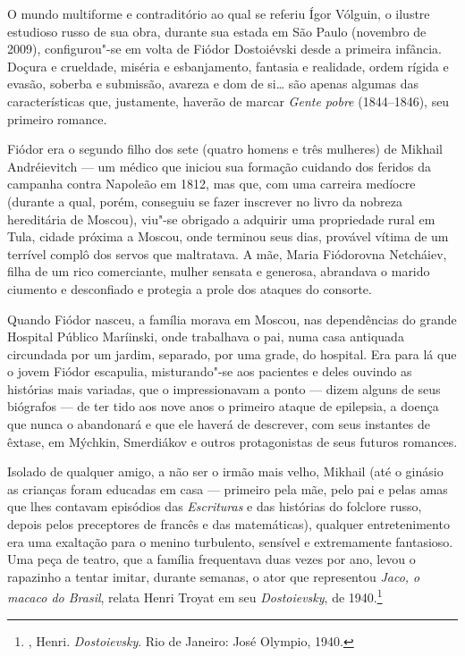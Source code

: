 O mundo multiforme e contraditório ao qual se referiu
Ígor Vólguin, o ilustre estudioso russo de sua obra, durante sua
estada em São Paulo (novembro de 2009), configurou"-se em volta
de Fiódor Dostoiévski desde a primeira infância. Doçura e
crueldade, miséria e esbanjamento, fantasia e realidade,
ordem rígida e evasão, soberba e submissão, avareza e dom
de si\ldots{} são apenas algumas das características que,
justamente, haverão de marcar \emph{Gente pobre} (1844--1846),
seu primeiro romance.

Fiódor era o segundo filho dos sete (quatro homens e três
mulheres) de Mikhail Andréievitch --- um médico que iniciou
sua formação cuidando dos feridos da campanha contra Napoleão
em 1812, mas que, com uma carreira medíocre (durante a qual,
porém, conseguiu se fazer inscrever no livro da nobreza
hereditária de Moscou), viu"-se obrigado a adquirir uma propriedade rural
em Tula, cidade próxima a Moscou, onde terminou seus dias,
provável vítima de um terrível complô dos servos que
maltratava. A mãe, Maria Fiódorovna Netcháiev, filha de um
rico comerciante, mulher sensata e generosa, abrandava o
marido ciumento e desconfiado e protegia a prole dos ataques do
consorte.

Quando Fiódor nasceu, a família morava em Moscou, nas dependências
do grande Hospital Público Maríinski, onde trabalhava o pai, numa
casa antiquada circundada por um jardim, separado, por uma grade,
do hospital. Era para lá que o jovem Fiódor escapulia,
misturando"-se aos pacientes e deles ouvindo as histórias mais
variadas, que o impressionavam a ponto --- dizem alguns de seus
biógrafos --- de ter tido aos nove anos o primeiro ataque de
epilepsia, a doença que nunca o abandonará e que ele haverá
de descrever, com seus instantes de êxtase, em Mýchkin,
Smerdiákov e outros protagonistas de seus futuros romances.

Isolado de qualquer amigo, a não ser o irmão mais velho, Mikhail
(até o ginásio as crianças foram educadas em casa --- primeiro
pela mãe, pelo pai e pelas amas que lhes contavam episódios das
\emph{Escrituras} e das histórias do folclore russo, depois pelos
preceptores de francês e das matemáticas), qualquer entretenimento
era uma exaltação para o menino turbulento, sensível e extremamente fantasioso. Uma peça de teatro, que a família frequentava duas vezes por ano, levou o rapazinho a tentar
imitar, durante semanas, o ator que representou \emph{Jaco, o
macaco do Brasil}, relata Henri Troyat em seu \emph{Dostoievsky},
de 1940.\footnote{, Henri. \emph{Dostoievsky}.
Rio de Janeiro: José Olympio, 1940.}

